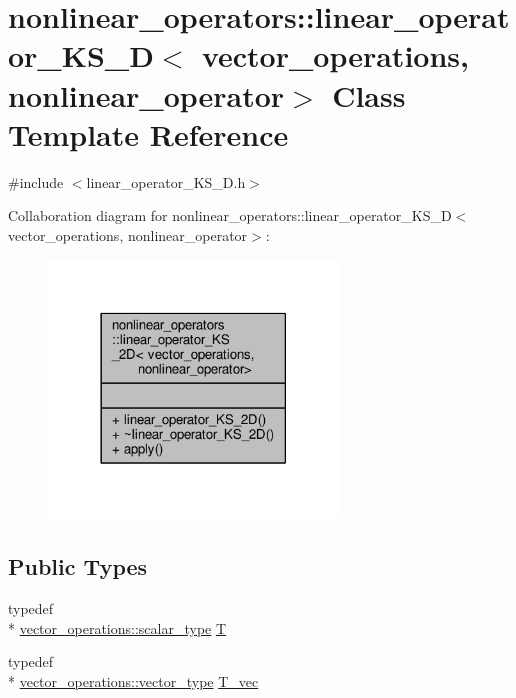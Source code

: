 \hypertarget{classnonlinear__operators_1_1linear__operator__KS__2D}{\section{nonlinear\-\_\-operators\-:\-:linear\-\_\-operator\-\_\-\-K\-S\-\_\-D$<$ vector\-\_\-operations, nonlinear\-\_\-operator$>$ Class Template Reference}
\label{classnonlinear__operators_1_1linear__operator__KS__2D}
}


{\ttfamily \#include $<$linear\-\_\-operator\-\_\-\-K\-S\-\_\-D.\-h$>$}



Collaboration diagram for nonlinear\-\_\-operators\-:\-:linear\-\_\-operator\-\_\-\-K\-S\-\_\-D$<$ vector\-\_\-operations, nonlinear\-\_\-operator$>$\-:
\nopagebreak
\begin{figure}[H]
\begin{center}
\leavevmode
\includegraphics[width=218pt]{classnonlinear__operators_1_1linear__operator__KS__2D__coll__graph}
\end{center}
\end{figure}
\subsection*{Public Types}
\begin{DoxyCompactItemize}
\item 
typedef \\*
\hyperlink{structcpu__vector__operations_aca6b216aa1fb172df83d98350e94fd61}{vector\-\_\-operations\-::scalar\-\_\-type} \hyperlink{classnonlinear__operators_1_1linear__operator__KS__2D_ab5ed31d39991f15dc88ef56cd373c84d}{T}
\item 
typedef \\*
\hyperlink{structcpu__vector__operations_a1962836df596ce262704d208e9a6d8f9}{vector\-\_\-operations\-::vector\-\_\-type} \hyperlink{classnonlinear__operators_1_1linear__operator__KS__2D_af68ec3eba6ca7f10f49f64b20a7259a1}{T\-\_\-vec}
\end{DoxyCompactItemize}
